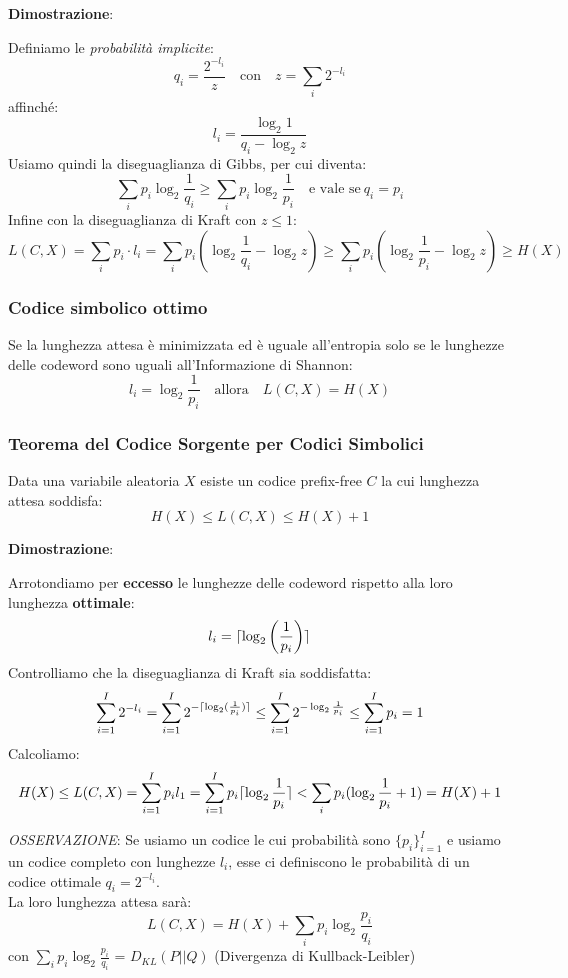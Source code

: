 \textbf{Dimostrazione}:

Definiamo le \textit{probabilità implicite}: 
$$
q_i = \frac{2^{-l_i}}{z}\quad \text{con} \quad z=\sum_{i} 2^{-l_i}
$$
affinché: 
$$
l_i = \frac{\log_{2} 1}{q_i - \log_{2} z}
$$
Usiamo quindi la diseguaglianza di Gibbs, per cui diventa:
$$
\sum_{i} p_i \log_{2} \frac{1}{q_i} \geq \sum_{i} p_i \log_2 \frac{1}{p_i}\quad \text{e vale se}\ q_i = p_i
$$
Infine con la diseguaglianza di Kraft con $z \leq 1$:
$$
L(C,X) = \sum_{i} p_i\cdot l_i = \sum_{i} p_i (\log_{2}\frac{1}{q_i} - \log_2 z) \geq \sum_{i} p_i (\log_{2}\frac{1}{p_i} - \log_2 z) \geq H(X)
$$

\subsubsection{Codice simbolico ottimo}
Se la lunghezza attesa è minimizzata ed è uguale all'entropia solo se le lunghezze delle codeword sono uguali all'Informazione di Shannon:
$$
l_i = \log_{2}\frac{1}{p_i}\quad \text{allora}\quad L(C,X)= H(X)
$$

\newpage
\subsubsection{Teorema del Codice Sorgente per Codici Simbolici}
Data una variabile aleatoria $X$ esiste un codice prefix-free $C$ la cui lunghezza attesa soddisfa:
\begin{equation}
	H(X) \leq L(C,X) \leq H(X) + 1
\end{equation}

\textbf{Dimostrazione}:

Arrotondiamo per \textbf{eccesso} le lunghezze delle codeword rispetto alla loro lunghezza \textbf{ottimale}: $$l_i = \lceil\log_{2}\left(\frac{1}{p_i}\right)\rceil$$
Controlliamo che la diseguaglianza di Kraft sia soddisfatta:
$$
\sum_{i=1}^{I} 2^{-l_i} = \sum_{i=1}^{I} 2^{-\lceil\log_{2}(\frac{1}{p_i})\rceil} \leq \sum_{i=1}^{I} 2^{-\log_{2}\frac{1}{p_i}} \leq \sum_{i=1}^{I} p_i = 1
$$
Calcoliamo:
$$
H(X) \leq L(C,X) = \sum_{i=1}^{I} p_i l_1 = \sum_{i=1}^{I} p_i \lceil\log_{2}\frac{1}{p_i}\rceil < \sum_{i} p_i (\log_{2} \frac{1}{p_i} + 1) = H(X) + 1
$$

\textit{OSSERVAZIONE}: Se usiamo un codice le cui probabilità sono $\{p_i\}_{i=1}^I$ e usiamo un codice completo con lunghezze $l_i$, esse ci definiscono le probabilità di un codice ottimale $q_i = 2^{-l_i}$.\\
La loro lunghezza attesa sarà:
$$
L(C,X) = H(X) + \sum_{i} p_i \log_{2}\frac{p_i}{q_i}
$$
con $\sum_{i} p_i \log_{2}\frac{p_i}{q_i}$ = $D_{KL}(P||Q)$ (Divergenza di Kullback-Leibler)


